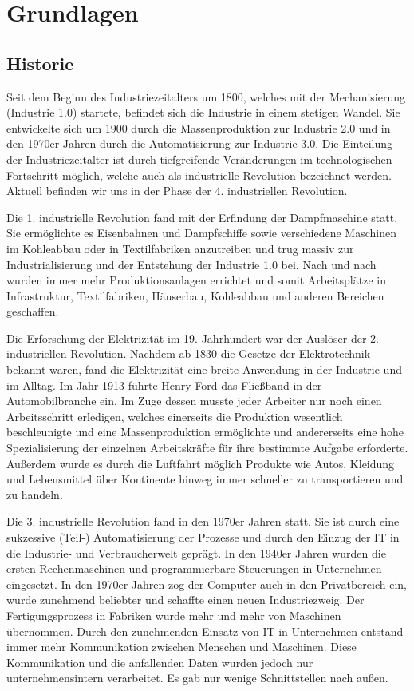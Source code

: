 \chapter{Grundlagen}
\section{Historie}
Seit dem Beginn des Industriezeitalters um 1800, welches mit der Mechanisierung (Industrie 1.0) startete, befindet sich die Industrie in einem stetigen Wandel. Sie entwickelte sich um 1900 durch die Massenproduktion zur Industrie 2.0 und in den 1970er Jahren durch die Automatisierung zur Industrie 3.0. Die Einteilung der Industriezeitalter ist durch tiefgreifende Veränderungen im technologischen Fortschritt möglich, welche auch als industrielle Revolution bezeichnet werden. Aktuell befinden wir uns in der Phase der 4. industriellen Revolution.

Die 1. industrielle Revolution fand mit der Erfindung der Dampfmaschine statt. Sie ermöglichte es Eisenbahnen und Dampfschiffe sowie verschiedene Maschinen im Kohleabbau oder in Textilfabriken anzutreiben und trug massiv zur Industrialisierung und der Entstehung der Industrie 1.0 bei. Nach und nach wurden immer mehr Produktionsanlagen errichtet und somit Arbeitsplätze in Infrastruktur, Textilfabriken, Häuserbau, Kohleabbau und anderen Bereichen geschaffen.

Die Erforschung der Elektrizität im 19. Jahrhundert war der Auslöser der 2. industriellen Revolution. Nachdem ab 1830 die Gesetze der Elektrotechnik bekannt waren, fand die Elektrizität eine breite Anwendung in der Industrie und im Alltag. Im Jahr 1913 führte Henry Ford das Fließband in der Automobilbranche ein. Im Zuge dessen musste jeder Arbeiter nur noch einen Arbeitsschritt erledigen, welches einerseits die Produktion wesentlich beschleunigte und eine Massenproduktion ermöglichte und andererseits eine hohe Spezialisierung der einzelnen Arbeitskräfte für ihre bestimmte Aufgabe erforderte. Außerdem wurde es durch die Luftfahrt möglich Produkte wie Autos, Kleidung und Lebensmittel über Kontinente hinweg immer schneller zu transportieren und zu handeln.

Die 3. industrielle Revolution fand in den 1970er Jahren statt. Sie ist durch eine sukzessive (Teil-) Automatisierung der Prozesse und durch den Einzug der IT in die Industrie- und Verbraucherwelt geprägt. In den 1940er Jahren wurden die ersten Rechenmaschinen und programmierbare Steuerungen in Unternehmen eingesetzt. In den 1970er Jahren zog der Computer auch in den Privatbereich ein, wurde zunehmend beliebter und schaffte einen neuen Industriezweig. Der Fertigungsprozess in Fabriken wurde mehr und mehr von Maschinen übernommen. Durch den zunehmenden Einsatz von IT in Unternehmen entstand immer mehr Kommunikation zwischen Menschen und Maschinen. Diese Kommunikation und die anfallenden Daten wurden jedoch nur unternehmensintern verarbeitet. Es gab nur wenige Schnittstellen nach außen.

